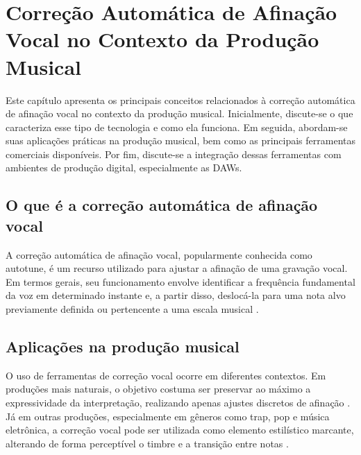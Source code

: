 \setcounter{secnumdepth}{3}
\setcounter{tocdepth}{1}

\chapter{\label{chap:autotune_contexto}Correção Automática de Afinação Vocal no Contexto da Produção Musical}

Este capítulo apresenta os principais conceitos relacionados à correção automática de afinação vocal no contexto da produção musical. Inicialmente, discute-se o que caracteriza esse tipo de tecnologia e como ela funciona. Em seguida, abordam-se suas aplicações práticas na produção musical, bem como as principais ferramentas comerciais disponíveis. Por fim, discute-se a integração dessas ferramentas com ambientes de produção digital, especialmente as DAWs.

\section{O que é a correção automática de afinação vocal}

A correção automática de afinação vocal, popularmente conhecida como autotune, é um recurso utilizado para ajustar a afinação de uma gravação vocal. Em termos gerais, seu funcionamento envolve identificar a frequência fundamental da voz em determinado instante e, a partir disso, deslocá-la para uma nota alvo previamente definida ou pertencente a uma escala musical \cite{decheveigne2002yin, mauch2014pyin}.

\section{Aplicações na produção musical}

O uso de ferramentas de correção vocal ocorre em diferentes contextos. Em produções mais naturais, o objetivo costuma ser preservar ao máximo a expressividade da interpretação, realizando apenas ajustes discretos de afinação \cite{moulines1990psola}. Já em outras produções, especialmente em gêneros como trap, pop e música eletrônica, a correção vocal pode ser utilizada como elemento estilístico marcante, alterando de forma perceptível o timbre e a transição entre notas \cite{antares_autotune_pro}.

